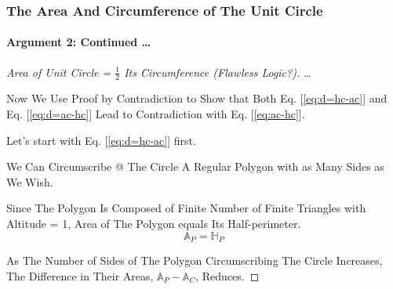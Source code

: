\begin{frame}
\frametitle{The Area And Circumference of The Unit Circle}
\framesubtitle{Argument 2: Continued \dots}
\label{slide:arg-2-archimedes-2}
\begin{proof}[Area of Unit Circle = $\frac{1}{2}$ Its Circumference ({\tiny Flawless Logic?})]
\let\qed\relax %
\dots

Now We Use \alert{Proof by Contradiction} to Show that Both Eq. [\ref{eq:d=hc-ac}] and Eq. [\ref{eq:d=ac-hc}] Lead to Contradiction with Eq. [\ref{eq:ac-hc}]. 

Let's start with Eq. [\ref{eq:d=hc-ac}] first.

We Can \alert{Circumscribe @ The Circle A Regular Polygon with as Many Sides as We Wish}.

Since The Polygon Is Composed of Finite Number of Finite Triangles with Altitude = 1, \alert{Area of The Polygon equals Its Half-perimeter}.
\begin{equation}
\label{eq:ap=hp}
\mathbb{A}_P=\mathbb{H}_P
\end{equation}

As The Number of Sides of The Polygon Circumscribing The Circle Increases, The Difference in Their Areas, $\mathbb{A}_P-\mathbb{A}_C$, Reduces.
\end{proof}
\end{frame}
